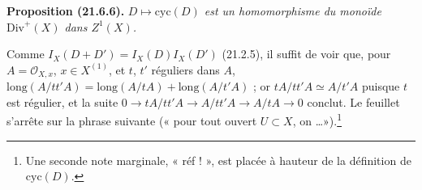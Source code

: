 \documentclass[11pt,a4paper]{article}
\begin{document}
\textbf{Proposition (21.6.6).} \emph{$D \mapsto \mathrm{cyc}(D)$ est un
homomorphisme du monoïde $\mathrm{Div}^{+}(X)$ dans $Z^{1}(X)$.}

Comme $I_{X}(D + D') = I_{X}(D)I_{X}(D')$ (21.2.5), il suffit de voir que,
pour $A = \mathcal{O}_{X,x}$, $x \in X^{(1)}$, et $t$, $t'$ réguliers dans $A$,
$\mathrm{long}(A/tt'A) = \mathrm{long}(A/tA) + \mathrm{long}(A/t'A)$ ; or
$tA/tt'A \simeq A/t'A$ puisque $t$ est régulier, et la suite $0 \to tA/tt'A
\to A/tt'A \to A/tA \to 0$ conclut. Le feuillet s'arrête sur la phrase
suivante (« pour tout ouvert $U \subset X$, on \ldots »).\footnote{Une
seconde note marginale, « réf ! », est placée à hauteur de la définition de
$\mathrm{cyc}(D)$.}
\end{document}
